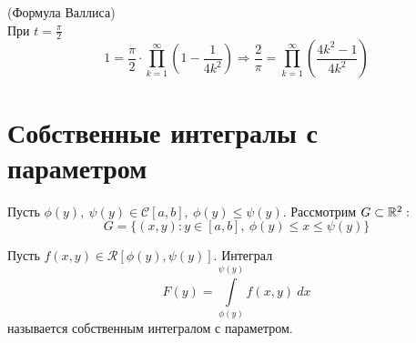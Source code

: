 \begin{consequense} (Формула Валлиса)\\
    При $t=\frac{\pi}{2}$
    \[1=\frac{\pi}{2}\cdot \prod\limits_{k=1}^{\infty}\left(1-\frac{1}{4k^2}\right) \Rightarrow \frac{2}{\pi}=\prod\limits_{k=1}^{\infty}\left(\frac{4k^2-1}{4k^2}\right)\]
\end{consequense}
\section{Собственные интегралы с параметром}
    Пусть $\phi(y),\ \psi(y)\in \mathcal{C}[a,b],\ \phi(y)\leq \psi(y)$. Рассмотрим $G\subset \mathbb{R}^2: $
    \[G=\{(x,y): y\in [a,b],\ \phi(y)\leq x\leq \psi(y)\}\]
\begin{definition} Пусть $f(x,y)\in \mathcal{R}[\phi(y),\psi(y)]$. Интеграл
    \[F(y)=\int\limits_{\phi(y)}^{\psi(y)}f(x,y)\ dx\]
    называется собственным интегралом с параметром.
\end{definition}